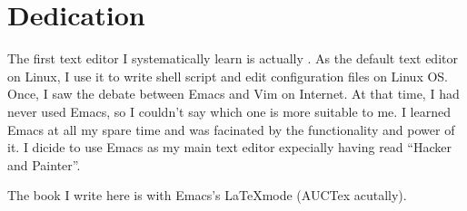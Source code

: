 \chapter{Dedication}
The first text editor I systematically learn is actually .
As the default text editor on Linux, I use it to write shell script and edit configuration files on Linux OS.
Once, I saw the debate between Emacs and Vim on Internet.
At that time, I had never used Emacs, so I couldn't say which one is more suitable to me.
I learned Emacs at all my spare time and was facinated by the functionality and power of it.
I dicide to use Emacs as my main text editor expecially having read ``Hacker and Painter''.


The book I write here is with Emacs's  \LaTeX mode (AUCTex acutally).



